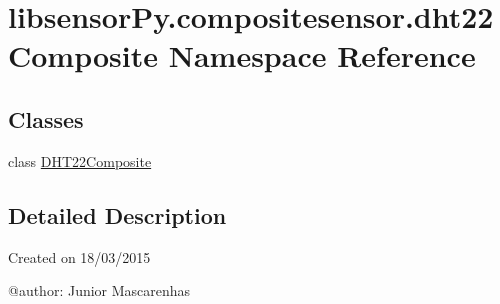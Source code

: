 \hypertarget{namespacelibsensorPy_1_1compositesensor_1_1dht22Composite}{}\section{libsensor\+Py.\+compositesensor.\+dht22\+Composite Namespace Reference}
\label{namespacelibsensorPy_1_1compositesensor_1_1dht22Composite}
\subsection*{Classes}
\begin{DoxyCompactItemize}
\item 
class \hyperlink{classlibsensorPy_1_1compositesensor_1_1dht22Composite_1_1DHT22Composite}{D\+H\+T22\+Composite}
\end{DoxyCompactItemize}


\subsection{Detailed Description}
\begin{DoxyVerb}Created on 18/03/2015

@author: Junior Mascarenhas
\end{DoxyVerb}
 